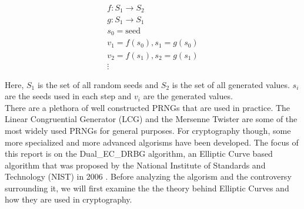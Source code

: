 \begin{gather}
    f: S_1 \rightarrow S_2 \\
    g : S_1 \rightarrow S_1\\
    s_0 = \text{seed}\\
    v_1 = f(s_0), s_1 = g(s_0) \nonumber\\
    v_2 = f(s_1), s_2 = g(s_1) \nonumber\\
    \vdots \nonumber
\end{gather}

\noindent
Here, $S_1$ is the set of all random seeds and $S_2$ is the set of all generated values. $s_i$ are the seeds used in each step and $v_i$ are the generated values.
\\

There are a plethora of well constructed PRNGs that are used in practice. The Linear Congruential Generator (LCG) and the Mersenne Twister are some of the most widely used PRNGs for general purposes. For cryptography though, some more specialized and more advanced algorisms have been developed. The focus of this report is on the Dual\_EC\_DRBG algorithm, an Elliptic Curve based algorithm that was proposed by the National Institute of Standards and Technology (NIST) in 2006 \cite{nist-sp800-90}. Before analyzing the algorism and the controversy surrounding it, we will first examine the the theory behind Elliptic Curves and how they are used in cryptography.
